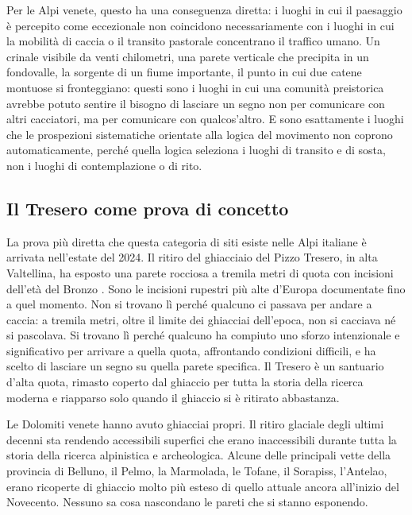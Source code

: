 Per le Alpi venete, questo ha una conseguenza diretta: i luoghi in cui il paesaggio è percepito come eccezionale non coincidono necessariamente con i luoghi in cui la mobilità di caccia o il transito pastorale concentrano il traffico umano. Un crinale visibile da venti chilometri, una parete verticale che precipita in un fondovalle, la sorgente di un fiume importante, il punto in cui due catene montuose si fronteggiano: questi sono i luoghi in cui una comunità preistorica avrebbe potuto sentire il bisogno di lasciare un segno non per comunicare con altri cacciatori, ma per comunicare con qualcos'altro. E sono esattamente i luoghi che le prospezioni sistematiche orientate alla logica del movimento non coprono automaticamente, perché quella logica seleziona i luoghi di transito e di sosta, non i luoghi di contemplazione o di rito.

\subsection*{Il Tresero come prova di concetto}

La prova più diretta che questa categoria di siti esiste nelle Alpi italiane è arrivata nell'estate del 2024. Il ritiro del ghiacciaio del Pizzo Tresero, in alta Valtellina, ha esposto una parete rocciosa a tremila metri di quota con incisioni dell'età del Bronzo \citep{tresero2024}. Sono le incisioni rupestri più alte d'Europa documentate fino a quel momento. Non si trovano lì perché qualcuno ci passava per andare a caccia: a tremila metri, oltre il limite dei ghiacciai dell'epoca, non si cacciava né si pascolava. Si trovano lì perché qualcuno ha compiuto uno sforzo intenzionale e significativo per arrivare a quella quota, affrontando condizioni difficili, e ha scelto di lasciare un segno su quella parete specifica. Il Tresero è un santuario d'alta quota, rimasto coperto dal ghiaccio per tutta la storia della ricerca moderna e riapparso solo quando il ghiaccio si è ritirato abbastanza.

Le Dolomiti venete hanno avuto ghiacciai propri. Il ritiro glaciale degli ultimi decenni sta rendendo accessibili superfici che erano inaccessibili durante tutta la storia della ricerca alpinistica e archeologica. Alcune delle principali vette della provincia di Belluno, il Pelmo, la Marmolada, le Tofane, il Sorapiss, l'Antelao, erano ricoperte di ghiaccio molto più esteso di quello attuale ancora all'inizio del Novecento. Nessuno sa cosa nascondano le pareti che si stanno esponendo.

